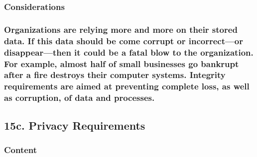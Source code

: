 \documentclass[
]{article}
\begin{document}
\hypertarget{considerations-37}{%
\subsubsection{Considerations}\label{considerations-37}}

\hypertarget{organizations-are-relying-more-and-more-on-their-stored-data.-if-this-data-should-be-come-corrupt-or-incorrector-disappearthen-it-could-be-a-fatal-blow-to-the-organization.-for-example-almost-half-of-small-businesses-go-bankrupt-after-a-fire-destroys-their-computer-systems.-integrity-requirements-are-aimed-at-preventing-complete-loss-as-well-as-corruption-of-data-and-processes.}{%
\subsubsection{\texorpdfstring{Organizations are relying more and more
on their stored data. If this data should be come corrupt or
incorrect---or disappear---then it could be a fatal blow to the
organization. For example, almost half of small businesses go bankrupt
after a fire destroys their computer systems. Integrity requirements are
aimed at preventing complete loss, as well as corruption, of data and
processes.
}{Organizations are relying more and more on their stored data. If this data should be come corrupt or incorrect---or disappear---then it could be a fatal blow to the organization. For example, almost half of small businesses go bankrupt after a fire destroys their computer systems. Integrity requirements are aimed at preventing complete loss, as well as corruption, of data and processes. }}\label{organizations-are-relying-more-and-more-on-their-stored-data.-if-this-data-should-be-come-corrupt-or-incorrector-disappearthen-it-could-be-a-fatal-blow-to-the-organization.-for-example-almost-half-of-small-businesses-go-bankrupt-after-a-fire-destroys-their-computer-systems.-integrity-requirements-are-aimed-at-preventing-complete-loss-as-well-as-corruption-of-data-and-processes.}}

\hypertarget{c.-privacy-requirements}{%
\subsection{15c. Privacy Requirements}\label{c.-privacy-requirements}}

\hypertarget{content-54}{%
\subsubsection{Content}\label{content-54}}
\end{document}

